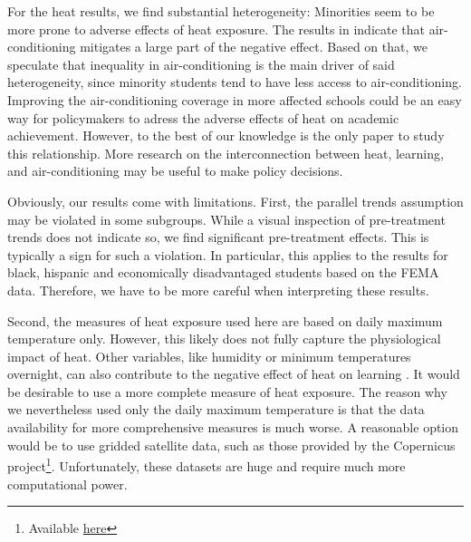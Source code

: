 For the heat results, we find substantial heterogeneity: Minorities seem to be more prone to adverse effects of heat exposure. The results in \cite{Goodman_2020} indicate that air-conditioning mitigates a large part of the negative effect. Based on that, we speculate that inequality in air-conditioning is the main driver of said heterogeneity, since minority students tend to have less access to air-conditioning. Improving the air-conditioning coverage in more affected schools could be an easy way for policymakers to adress the adverse effects of heat on academic achievement. However, to the best of our knowledge \cite{Goodman_2020} is the only paper to study this relationship. More research on the interconnection between heat, learning, and air-conditioning may be useful to make policy decisions.

Obviously, our results come with limitations. First, the parallel trends assumption may be violated in some subgroups. While a visual inspection of pre-treatment trends does not indicate so, we find significant pre-treatment effects. This is typically a sign for such a violation. In particular, this applies to the results for black, hispanic and economically disadvantaged students based on the FEMA data. Therefore, we have to be more careful when interpreting these results.

Second, the measures of heat exposure used here are based on daily maximum temperature only. However, this likely does not fully capture the physiological impact of heat. Other variables, like humidity or minimum temperatures overnight, can also contribute to the negative effect of heat on learning \citep[for an extensive discussion of heat exposure measurement see][]{Rennie_2021}. It would be desirable to use a more complete measure of heat exposure. The reason why we nevertheless used only the daily maximum temperature is that the data availability for more comprehensive measures is much worse. A reasonable option would be to use gridded satellite data, such as those provided by the Copernicus project\footnote{Available \href{https://climate.copernicus.eu/}{here}}. Unfortunately, these datasets are huge and require much more computational power.


